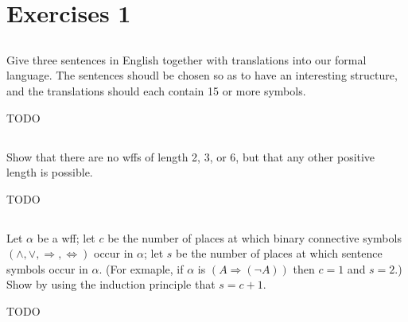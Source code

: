 \documentclass{report}
\begin{document}
\section{Exercises 1}%

\subsection{}%

Give three sentences in English together with translations into our formal
  language.
The sentences shoudl be chosen so as to have an interesting structure, and the
  translations should each contain 15 or more symbols.

\begin{answer}

  TODO

\end{answer}

\subsection{}%

Show that there are no wffs of length 2, 3, or 6, but that any other positive
  length is possible.

\begin{answer}

  TODO

\end{answer}

\subsection{}%

Let $\alpha$ be a wff; let $c$ be the number of places at which binary
  connective symbols $(\land, \lor, \Rightarrow, \Leftrightarrow)$ occur in
  $\alpha$; let $s$ be the number of places at which sentence symbols occur in
  $\alpha$.
(For exmaple, if $\alpha$ is $(A \Rightarrow (\neg A))$ then $c = 1$ and $s = 2$.)
Show by using the induction principle that $s = c + 1$.

\begin{answer}

  TODO

\end{answer}

\subsection{}%
\end{document}

